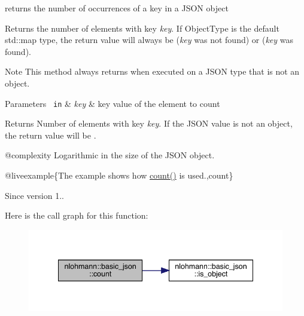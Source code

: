 returns the number of occurrences of a key in a J\+S\+ON object 

Returns the number of elements with key {\itshape key}. If Object\+Type is the default {\ttfamily std\+::map} type, the return value will always be {} ({\itshape key} was not found) or {} ({\itshape key} was found).

\begin{DoxyNote}{Note}
This method always returns {} when executed on a J\+S\+ON type that is not an object.
\end{DoxyNote}

\begin{DoxyParams}[1]{Parameters}
\mbox{\texttt{ in}}  & {\em key} & key value of the element to count\\
\hline
\end{DoxyParams}
\begin{DoxyReturn}{Returns}
Number of elements with key {\itshape key}. If the J\+S\+ON value is not an object, the return value will be {}.
\end{DoxyReturn}
@complexity Logarithmic in the size of the J\+S\+ON object.

@liveexample\{The example shows how {\ttfamily \mbox{\hyperlink{classnlohmann_1_1basic__json_a5261eba9637f59d17d6cab5f14ce5747}{count()}}} is used.,count\}

\begin{DoxySince}{Since}
version 1.. 
\end{DoxySince}
Here is the call graph for this function\+:\nopagebreak
\begin{figure}[H]
\begin{center}
\leavevmode
\includegraphics[width=341pt]{classnlohmann_1_1basic__json_a5261eba9637f59d17d6cab5f14ce5747_cgraph}
\end{center}
\end{figure}
\mbox{\label{classnlohmann_1_1basic__json_a1e0769d22d54573f294da0e5c6abc9de}} 
